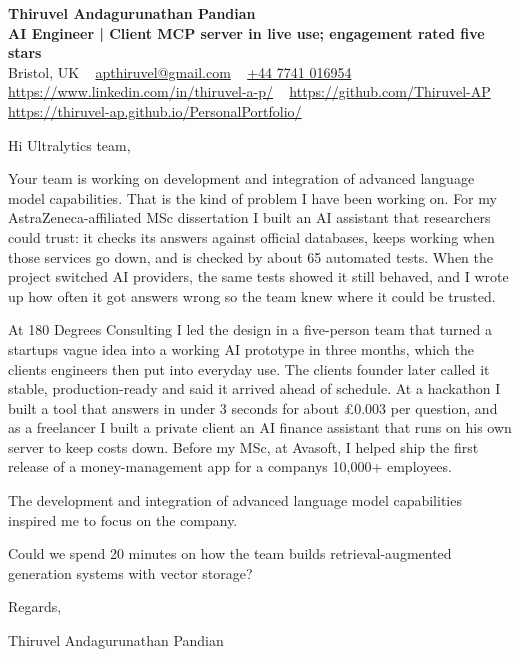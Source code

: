 \documentclass[11pt,a4paper]{article}
\begin{document}
\raggedright
\pagestyle{empty}

\begin{center}
    {\LARGE \color{linkblue} \textbf{Thiruvel Andagurunathan Pandian}}\\[0.2cm]
    {\color{headernavy}\small\textbf{AI Engineer | Client MCP server in live use; engagement rated five stars}}\\[0.2cm]
    {\small Bristol, UK\nobreak\ \,\textbar\, \href{mailto:apthiruvel@gmail.com}{apthiruvel@gmail.com}\nobreak\ \,\textbar\, \href{tel:+447741016954}{+44 7741 016954}\nobreak\ \,\textbar\, \href{https://www.linkedin.com/in/thiruvel-a-p/}{https://www.linkedin.com/in/thiruvel-a-p/}\nobreak\ \,\textbar\, \href{https://github.com/Thiruvel-AP}{https://github.com/Thiruvel-AP}\nobreak\ \,\textbar\, \href{https://thiruvel-ap.github.io/PersonalPortfolio/}{https://thiruvel-ap.github.io/PersonalPortfolio/}}

\end{center}

\vspace{0.4cm}

\noindent
Hi Ultralytics team,

Your team is working on development and integration of advanced language model capabilities. That is the kind of problem I have been working on. For my AstraZeneca-affiliated MSc dissertation I built an AI assistant that researchers could trust: it checks its answers against official databases, keeps working when those services go down, and is checked by about 65 automated tests. When the project switched AI providers, the same tests showed it still behaved, and I wrote up how often it got answers wrong so the team knew where it could be trusted.

At 180 Degrees Consulting I led the design in a five-person team that turned a startup\textquotesingle{}s vague idea into a working AI prototype in three months, which the client\textquotesingle{}s engineers then put into everyday use. The client\textquotesingle{}s founder later called it \textquotedbl{}stable, production-ready\textquotedbl{} and said it arrived \textquotedbl{}ahead of schedule\textquotedbl{}. At a hackathon I built a tool that answers in under 3 seconds for about £0.003 per question, and as a freelancer I built a private client an AI finance assistant that runs on his own server to keep costs down. Before my MSc, at Avasoft, I helped ship the first release of a money-management app for a company\textquotesingle{}s 10,000+ employees.

The development and integration of advanced language model capabilities inspired me to focus on the company.

Could we spend 20 minutes on how the team builds retrieval-augmented generation systems with vector storage?

\vspace{0.5cm}

Regards,

Thiruvel Andagurunathan Pandian
\end{document}
